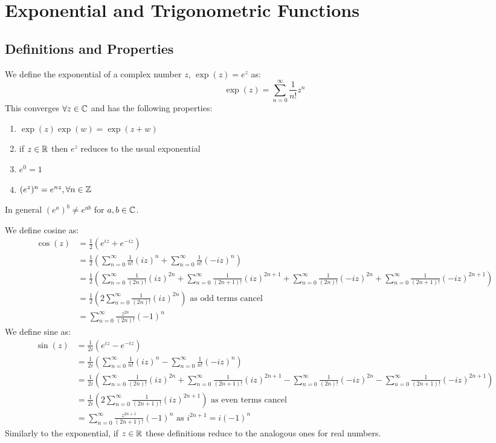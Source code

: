 \documentclass[../main.tex]{subfiles}
\begin{document}
\section{Exponential and Trigonometric Functions}
\subsection{Definitions and Properties}
We define the exponential of a complex number $z$, $\exp(z) = e^z$ as:
\[
  \exp(z) = \sum_{n=0}^{\infty} \frac{1}{n!} z^n
\]
This converges $\forall z \in \mathbb{C}$ and has the following properties:
\begin{enumerate}
  \item $\exp(z)\exp(w) = \exp(z + w)$
  \item if $z \in \mathbb{R}$ then $e^z$ reduces to the usual exponential
  \item $e^0 = 1$
  \item $(e^z)^n = e^{nz}, \forall n \in \mathbb{Z}$
\end{enumerate}
\begin{remark}[Warning]
  In general $(e^{a})^{b} \neq e^{ab}$ for $a, b \in \mathbb{C}$.
\end{remark}
We define cosine as:
\begin{align*}
  \cos(z) &= \frac{1}{2}(e^{iz} + e^{-iz}) \\
          &= \frac{1}{2}\left(\sum_{n=0}^{\infty} \frac{1}{n!} (iz)^{n} + \sum_{n=0}^{\infty} \frac{1}{n!} (-iz)^{n}\right) \\
          &= \frac{1}{2}\left(\sum_{n=0}^{\infty} \frac{1}{(2n)!}(iz)^{2n} + \sum_{n=0}^{\infty} \frac{1}{(2n + 1)!}(iz)^{2n + 1} + \sum_{n=0}^{\infty} \frac{1}{(2n)!}(-iz)^{2n} + \sum_{n=0}^{\infty} \frac{1}{(2n + 1)!}(-iz)^{2n + 1}\right) \\
          &= \frac{1}{2} \left(2\sum_{n=0}^{\infty} \frac{1}{(2n)!} (iz)^{2n}\right) \text{ as odd terms cancel}\\
          &= \sum_{n=0}^{\infty} \frac{z^{2n}}{(2n)!} (-1)^{n}
\end{align*}
We define sine as:
\begin{align*}
  \sin(z) &= \frac{1}{2i}(e^{iz} - e^{-iz}) \\
          &= \frac{1}{2i}\left(\sum_{n=0}^{\infty} \frac{1}{n!} (iz)^{n} - \sum_{n=0}^{\infty} \frac{1}{n!} (-iz)^{n}\right) \\
          &= \frac{1}{2i}\left(\sum_{n=0}^{\infty} \frac{1}{(2n)!}(iz)^{2n} + \sum_{n=0}^{\infty} \frac{1}{(2n + 1)!}(iz)^{2n + 1} - \sum_{n=0}^{\infty} \frac{1}{(2n)!}(-iz)^{2n} - \sum_{n=0}^{\infty} \frac{1}{(2n + 1)!}(-iz)^{2n + 1}\right) \\
          &= \frac{1}{2i} \left(2\sum_{n=0}^{\infty} \frac{1}{(2n + 1)!} (iz)^{2n + 1}\right) \text{ as even terms cancel}\\
          &= \sum_{n=0}^{\infty} \frac{z^{2n + 1}}{(2n + 1)!} (-1)^{n} \text{ as $i^{2n + 1} = i(-1)^{n}$}
\end{align*}
Similarly to the exponential, if $z \in \mathbb{R}$ these definitions reduce to the analogous ones for real numbers.
\end{document}
